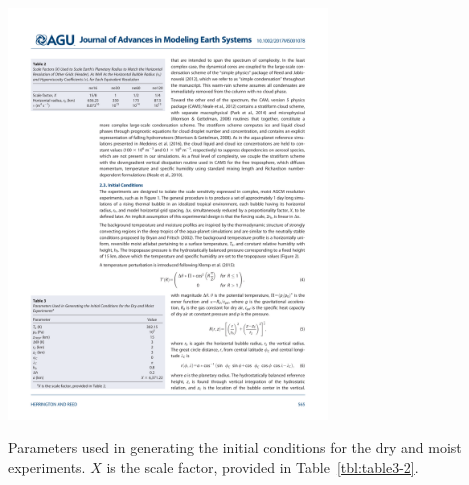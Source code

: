 \begin{table}
\begin{center}
\noindent\includegraphics[width=20pc,angle=0]{chapter3/table3.pdf}\\
\end{center}
\caption{Parameters used in generating the initial conditions for the dry and moist experiments. $X$ is the scale factor, provided in Table~\ref{tbl:table3-2}.}
\label{tbl:table3-3}
\end{table}

